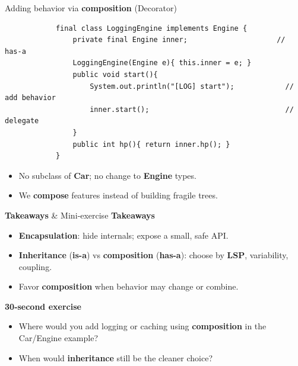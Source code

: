 \documentclass[11pt,aspectratio=169]{beamer}
\begin{document}
	\begin{frame}[fragile]{Adding behavior via \textbf{composition} (Decorator)}
		\begin{lstlisting}
			final class LoggingEngine implements Engine {
				private final Engine inner;                     // has-a
				LoggingEngine(Engine e){ this.inner = e; }
				public void start(){
					System.out.println("[LOG] start");            // add behavior
					inner.start();                                // delegate
				}
				public int hp(){ return inner.hp(); }
			}
		\end{lstlisting}
		\begin{itemize}
			\item No subclass of \textbf{Car}; no change to \textbf{Engine} types.
			\item We \textbf{compose} features instead of building fragile trees.
		\end{itemize}
	\end{frame}
	
	\begin{frame}[fragile]{\textbf{Takeaways} \& Mini‑exercise}
		\textbf{Takeaways}
		\begin{itemize}
			\item \textbf{Encapsulation}: hide internals; expose a small, safe API.
			\item \textbf{Inheritance} (\textbf{is-a}) vs \textbf{composition} (\textbf{has-a}): choose by \textbf{LSP}, variability, coupling.
			\item Favor \textbf{composition} when behavior may change or combine.
		\end{itemize}
		\medskip
		\textbf{30‑second exercise}
		\begin{itemize}
			\item Where would you add logging or caching using \textbf{composition} in the Car/Engine example?
			\item When would \textbf{inheritance} still be the cleaner choice?
		\end{itemize}
	\end{frame}
	
\end{document}
